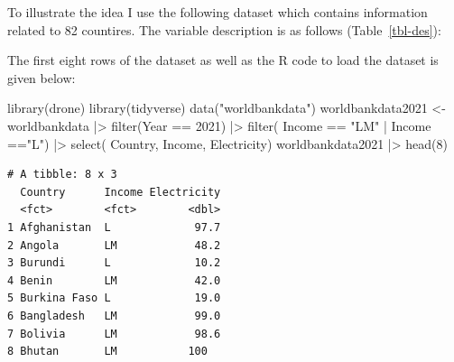 \documentclass[
  letterpaper,
  DIV=11,
  numbers=noendperiod]{scrreprt}
\newenvironment{Shaded}{\begin{snugshade}}{\end{snugshade}}
\newcommand{\DecValTok}[1]{\textcolor[rgb]{0.68,0.00,0.00}{#1}}
\newcommand{\FunctionTok}[1]{\textcolor[rgb]{0.28,0.35,0.67}{#1}}
\newcommand{\NormalTok}[1]{\textcolor[rgb]{0.00,0.23,0.31}{#1}}
\newcommand{\OtherTok}[1]{\textcolor[rgb]{0.00,0.23,0.31}{#1}}
\newcommand{\SpecialCharTok}[1]{\textcolor[rgb]{0.37,0.37,0.37}{#1}}
\newcommand{\StringTok}[1]{\textcolor[rgb]{0.13,0.47,0.30}{#1}}
\begin{document}
To illustrate the idea I use the following dataset which contains
information related to 82 countires. The variable description is as
follows (Table~\ref{tbl-des}):

\begin{table}

\caption{\label{tbl-des}Variable Description}


\end{table}%

The first eight rows of the dataset as well as the R code to load the
dataset is given below:

\begin{Shaded}
\begin{Highlighting}[]
\FunctionTok{library}\NormalTok{(drone)}
\FunctionTok{library}\NormalTok{(tidyverse)}
\FunctionTok{data}\NormalTok{(}\StringTok{"worldbankdata"}\NormalTok{)}
\NormalTok{worldbankdata2021 }\OtherTok{\textless{}{-}}\NormalTok{ worldbankdata }\SpecialCharTok{|\textgreater{}} \FunctionTok{filter}\NormalTok{(Year }\SpecialCharTok{==} \DecValTok{2021}\NormalTok{) }\SpecialCharTok{|\textgreater{}}
  \FunctionTok{filter}\NormalTok{( Income }\SpecialCharTok{==} \StringTok{"LM"} \SpecialCharTok{|}\NormalTok{ Income }\SpecialCharTok{==}\StringTok{"L"}\NormalTok{) }\SpecialCharTok{|\textgreater{}} 
  \FunctionTok{select}\NormalTok{( Country, Income, Electricity)}
\NormalTok{worldbankdata2021 }\SpecialCharTok{|\textgreater{}} \FunctionTok{head}\NormalTok{(}\DecValTok{8}\NormalTok{)}
\end{Highlighting}
\end{Shaded}

\begin{verbatim}
# A tibble: 8 x 3
  Country      Income Electricity
  <fct>        <fct>        <dbl>
1 Afghanistan  L             97.7
2 Angola       LM            48.2
3 Burundi      L             10.2
4 Benin        LM            42.0
5 Burkina Faso L             19.0
6 Bangladesh   LM            99.0
7 Bolivia      LM            98.6
8 Bhutan       LM           100  
\end{verbatim}
\end{document}
